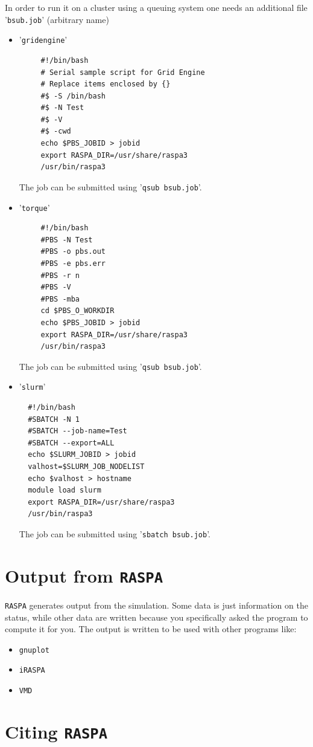 In order to run it on a cluster using a queuing system one needs an additional file '\texttt{bsub.job}' (arbitrary name)
\begin{itemize}
  \item{'\texttt{gridengine}'}
  \begin{verbatim}
     #!/bin/bash
     # Serial sample script for Grid Engine
     # Replace items enclosed by {}
     #$ -S /bin/bash
     #$ -N Test
     #$ -V
     #$ -cwd
     echo $PBS_JOBID > jobid
     export RASPA_DIR=/usr/share/raspa3
     /usr/bin/raspa3
  \end{verbatim}
    The job can be submitted using '\texttt{qsub bsub.job}'.
  \item{'\texttt{torque}'}
  \begin{verbatim}
     #!/bin/bash
     #PBS -N Test
     #PBS -o pbs.out
     #PBS -e pbs.err
     #PBS -r n
     #PBS -V
     #PBS -mba
     cd $PBS_O_WORKDIR
     echo $PBS_JOBID > jobid
     export RASPA_DIR=/usr/share/raspa3
     /usr/bin/raspa3
  \end{verbatim}
    The job can be submitted using '\texttt{qsub bsub.job}'.
  \item{'\texttt{slurm}'}
\begin{verbatim}
  #!/bin/bash 
  #SBATCH -N 1
  #SBATCH --job-name=Test
  #SBATCH --export=ALL
  echo $SLURM_JOBID > jobid
  valhost=$SLURM_JOB_NODELIST
  echo $valhost > hostname
  module load slurm
  export RASPA_DIR=/usr/share/raspa3
  /usr/bin/raspa3
\end{verbatim}
    The job can be submitted using '\texttt{sbatch bsub.job}'.
\end{itemize}


\section{Output from \texttt{RASPA}}
\texttt{RASPA} generates output from the simulation. Some data is just information on the status, while other data are written because you
specifically asked the program to compute it for you. The output is written to be used with other programs like:
\begin{itemize}
  \item{\texttt{gnuplot}}
  \item{\texttt{iRASPA}}
  \item{\texttt{VMD}}
\end{itemize}

\section{Citing \texttt{RASPA}}

